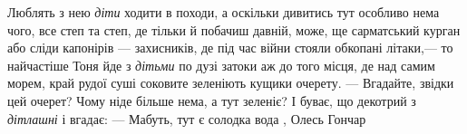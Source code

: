 Люблять з нею \emph{діти} ходити в походи, а оскільки дивитись тут особливо
нема чого, все степ та степ, де тільки й побачиш давній, може, ще сарматський
курган або сліди капонірів — захисників, де під час війни стояли обкопані
літаки,— то найчастіше Тоня йде з \emph{дітьми} по дузі затоки аж до того
місця, де над самим морем, край рудої суші соковите зеленіють кущики очерету.
— Вгадайте, звідки цей очерет? Чому ніде більше нема, а тут зеленіє?  І буває,
що декотрий з \emph{дітлашні} і вгадає: — Мабуть, тут є солодка вода
, Олесь Гончар
